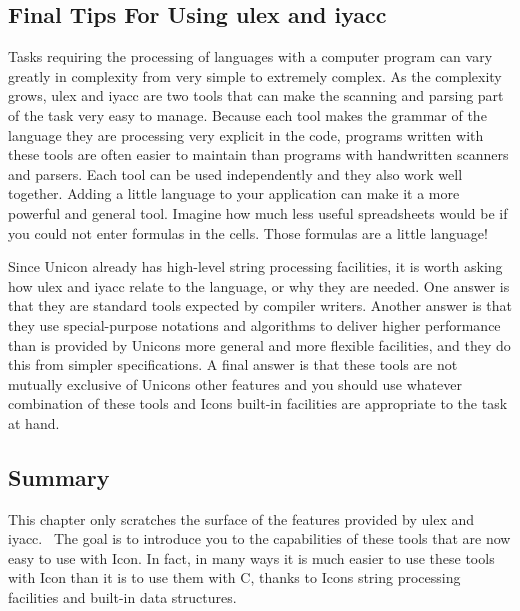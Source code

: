 \subsection{Final Tips For Using ulex and iyacc}

Tasks requiring the processing of languages with a computer program can
vary greatly in complexity from very simple to extremely complex. As
the complexity grows, \textsf{ulex} and \textsf{iyacc} are two tools
that can make the scanning and parsing part of the task very easy to
manage. Because each tool makes the grammar of the language they are
processing very explicit in the code, programs written with these tools
are often easier to maintain than programs with handwritten scanners
and parsers. Each tool can be used independently and they also work
well together. Adding a little language to your application can make it
a more powerful and general tool. Imagine how much less useful
spreadsheets would be if you could not enter formulas in the cells.
Those formulas are a little language!

Since Unicon already has high-level string processing facilities, it is
worth asking how \textsf{ulex} and \textsf{iyacc} relate to the
language, or why they are needed. One answer is that they are standard
tools expected by compiler writers. Another answer is
that they use special-purpose notations and algorithms to deliver
higher performance than is provided by Unicon{\textquotesingle}s more
general and more flexible facilities, and they do this from simpler
specifications. A final answer is that these tools are not mutually
exclusive of Unicon{\textquotesingle}s other features and you should
use whatever combination of these tools and Icon{\textquotesingle}s
built-in facilities are appropriate to the task at hand.

\subsection{Summary}

This chapter only scratches the surface of the features provided by
u\textsf{lex} and \textsf{iyacc}. \ The goal is to introduce you to the
capabilities of these tools that are now easy to use with Icon. In
fact, in many ways it is much easier to use these tools with Icon than
it is to use them with C, thanks to Icon{\textquotesingle}s string
processing facilities and built-in data structures. 

\clearpage
\bigskip

